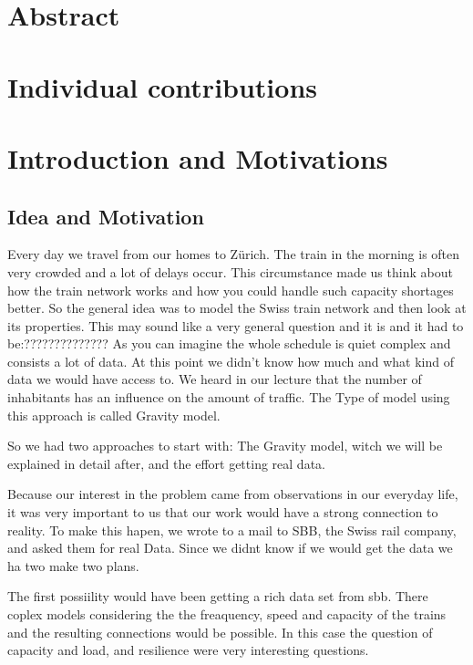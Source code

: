 \documentclass[11pt]{article}
\begin{document}
\section{Abstract}

\section{Individual contributions}

\section{Introduction and Motivations}

\subsection{Idea and Motivation}


Every day we travel from our homes to Zürich. The train in the morning is often very crowded and a lot of delays occur. This circumstance made us think about how the train network works and how you could handle such capacity shortages better. 
So the general idea was to model the Swiss train network and then look at its properties. This may sound like a very general question and it is and it had to be:?????????????? As you can imagine the whole schedule is quiet complex and consists a lot of data. At this point we didn't know how much and what kind of data we would have access to. We heard in our lecture that the number of inhabitants has an influence on the amount of traffic. The Type of model using this approach is called Gravity model.

So we had two approaches to start with: The Gravity model, witch we will be explained in detail after, and the effort getting real data.

Because our interest in the problem came from observations in our everyday life, it was very important to us that our work would have a strong connection to reality. To make this hapen, we wrote to a mail to SBB, the Swiss rail company, and asked them for real Data. Since we didnt know if we would get the data we ha two make two plans.

The first possiility would have been getting a rich data set from sbb. There coplex models considering the the freaquency, speed and capacity of the trains and the resulting connections would be possible. In this case the question of capacity and load, and resilience were very interesting questions.
\end{document}
